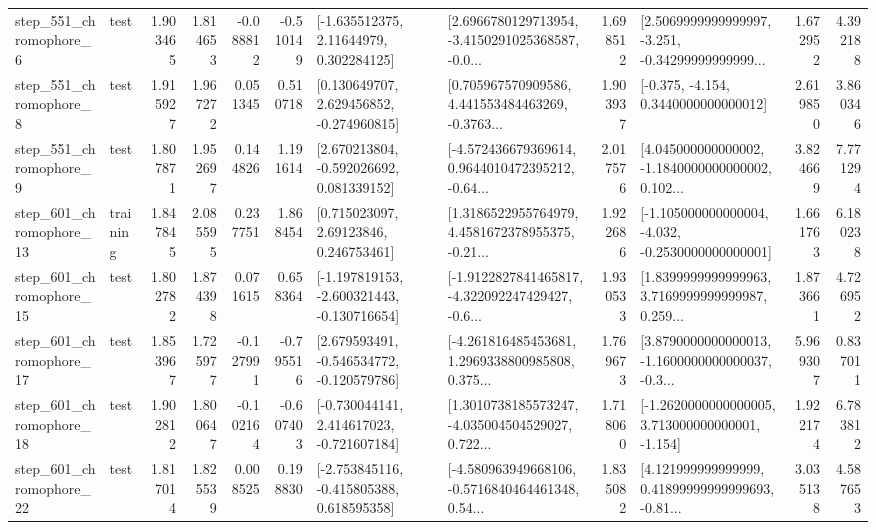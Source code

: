 \begin{tabular}{llrrrrllrlrr}
   step\_551\_chromophore\_6 &      test &      1.903465 &    1.814653 &     -0.088812 & -0.510149 &     [-1.635512375, 2.11644979, 0.302284125] &  [2.6966780129713954, -3.4150291025368587, -0.0... &       1.698512 &  [2.5069999999999997, -3.251, -0.34299999999999... &            1.672952 &          4.392188 \\
   step\_551\_chromophore\_8 &      test &      1.915927 &    1.967272 &      0.051345 &  0.510718 &    [0.130649707, 2.629456852, -0.274960815] &  [0.705967570909586, 4.441553484463269, -0.3763... &       1.903937 &               [-0.375, -4.154, 0.3440000000000012] &            2.619850 &          3.860346 \\
   step\_551\_chromophore\_9 &      test &      1.807871 &    1.952697 &      0.144826 &  1.191614 &    [2.670213804, -0.592026692, 0.081339152] &  [-4.572436679369614, 0.9644010472395212, -0.64... &       2.017576 &  [4.045000000000002, -1.1840000000000002, 0.102... &            3.824669 &          7.771294 \\
  step\_601\_chromophore\_13 &  training &      1.847845 &    2.085595 &      0.237751 &  1.868454 &      [0.715023097, 2.69123846, 0.246753461] &  [1.3186522955764979, 4.4581672378955375, -0.21... &       1.922686 &  [-1.105000000000004, -4.032, -0.2530000000000001] &            1.661763 &          6.180238 \\
  step\_601\_chromophore\_15 &      test &      1.802782 &    1.874398 &      0.071615 &  0.658364 &  [-1.197819153, -2.600321443, -0.130716654] &  [-1.9122827841465817, -4.322092247429427, -0.6... &       1.930533 &  [1.8399999999999963, 3.7169999999999987, 0.259... &            1.873661 &          4.726952 \\
  step\_601\_chromophore\_17 &      test &      1.853967 &    1.725977 &     -0.127991 & -0.795516 &   [2.679593491, -0.546534772, -0.120579786] &  [-4.261816485453681, 1.2969338800985808, 0.375... &       1.769673 &  [3.8790000000000013, -1.1600000000000037, -0.3... &            5.969307 &          0.837011 \\
  step\_601\_chromophore\_18 &      test &      1.902812 &    1.800647 &     -0.102164 & -0.607403 &   [-0.730044141, 2.414617023, -0.721607184] &  [1.3010738185573247, -4.035004504529027, 0.722... &       1.718060 &   [-1.2620000000000005, 3.713000000000001, -1.154] &            1.922174 &          6.783812 \\
  step\_601\_chromophore\_22 &      test &      1.817014 &    1.825539 &      0.008525 &  0.198830 &   [-2.753845116, -0.415805388, 0.618595358] &  [-4.580963949668106, -0.5716840464461348, 0.54... &       1.835082 &  [4.121999999999999, 0.41899999999999693, -0.81... &            3.035138 &          4.587653 \\

\end{tabular}
